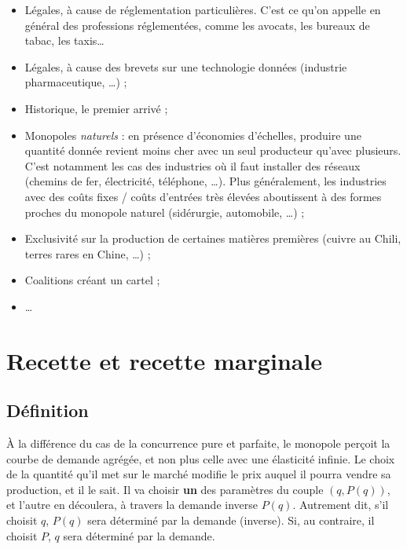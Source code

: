 \documentclass[
  a4paper,
]{book}
\providecommand{\tightlist}{%
  \setlength{\itemsep}{0pt}\setlength{\parskip}{0pt}}
\theoremstyle{definition}
\theoremstyle{definition}
\theoremstyle{definition}
\theoremstyle{definition}
\theoremstyle{remark}
\begin{document}
\begin{itemize}
\tightlist
\item
  Légales, à cause de réglementation particulières.
  C'est ce qu'on appelle en général des professions réglementées, comme les avocats, les bureaux de tabac, les taxis\ldots{}
\item
  Légales, à cause des brevets sur une technologie données (industrie pharmaceutique, \ldots) ;
\item
  Historique, le premier arrivé ;
\item
  Monopoles \emph{naturels} : en présence d'économies d'échelles, produire une quantité donnée revient moins cher avec un seul producteur qu'avec plusieurs.
  C'est notamment les cas des industries où il faut installer des réseaux (chemins de fer, électricité, téléphone, \ldots).
  Plus généralement, les industries avec des coûts fixes / coûts d'entrées très élevées aboutissent à des formes proches du monopole naturel (sidérurgie, automobile, \ldots) ;
\item
  Exclusivité sur la production de certaines matières premières (cuivre au Chili, terres rares en Chine, \ldots) ;
\item
  Coalitions créant un cartel ;
\item
  \ldots{}
\end{itemize}

\hypertarget{recette-et-recette-marginale}{%
\section{Recette et recette marginale}\label{recette-et-recette-marginale}}

\hypertarget{duxe9finition}{%
\subsection{Définition}\label{duxe9finition}}

À la différence du cas de la concurrence pure et parfaite, le monopole perçoit la courbe de demande agrégée, et non plus celle avec une élasticité infinie.
Le choix de la quantité qu'il met sur le marché modifie le prix auquel il pourra vendre sa production, et il le sait.
Il va choisir \textbf{un} des paramètres du couple \((q, P(q))\), et l'autre en découlera, à travers la demande inverse \(P(q)\).
Autrement dit, s'il choisit \(q\), \(P(q)\) sera déterminé par la demande (inverse).
Si, au contraire, il choisit \(P\), \(q\) sera déterminé par la demande.
\end{document}

